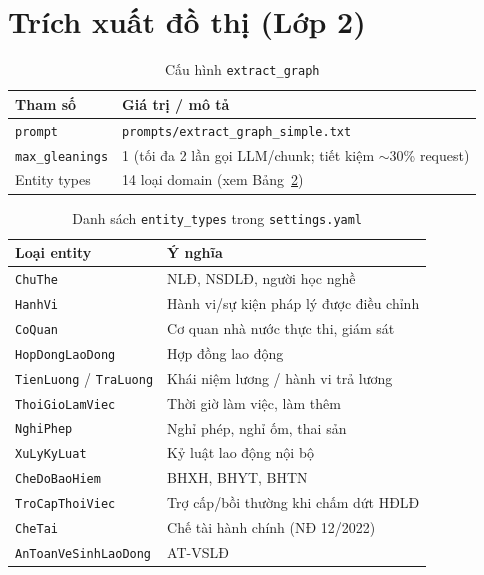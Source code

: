 \documentclass[../DoAn.tex]{subfiles}
\begin{document}
\section{Trích xuất đồ thị (Lớp 2)}
\label{appendix:a-extract}

\begin{table}[htbp]
\centering
\caption{Cấu hình \texttt{extract\_graph}}
\label{table:extract-config}
\small
\begin{tabular}{|l|p{9.5cm}|}
\hline
\textbf{Tham số} & \textbf{Giá trị / mô tả} \\
\hline
\texttt{prompt} & \texttt{prompts/extract\_graph\_simple.txt} \\
\texttt{max\_gleanings} & 1 (tối đa 2 lần gọi LLM/chunk; tiết kiệm $\sim$30\% request) \\
Entity types & 14 loại domain (xem Bảng~\ref{table:entity-types}) \\
\hline
\end{tabular}
\end{table}

\begin{table}[htbp]
\centering
\caption{Danh sách \texttt{entity\_types} trong \texttt{settings.yaml}}
\label{table:entity-types}
\small
\begin{tabular}{|l|p{8.5cm}|}
\hline
\textbf{Loại entity} & \textbf{Ý nghĩa} \\
\hline
\texttt{ChuThe} & NLĐ, NSDLĐ, người học nghề \\
\texttt{HanhVi} & Hành vi/sự kiện pháp lý được điều chỉnh \\
\texttt{CoQuan} & Cơ quan nhà nước thực thi, giám sát \\
\texttt{HopDongLaoDong} & Hợp đồng lao động \\
\texttt{TienLuong} / \texttt{TraLuong} & Khái niệm lương / hành vi trả lương \\
\texttt{ThoiGioLamViec} & Thời giờ làm việc, làm thêm \\
\texttt{NghiPhep} & Nghỉ phép, nghỉ ốm, thai sản \\
\texttt{XuLyKyLuat} & Kỷ luật lao động nội bộ \\
\texttt{CheDoBaoHiem} & BHXH, BHYT, BHTN \\
\texttt{TroCapThoiViec} & Trợ cấp/bồi thường khi chấm dứt HĐLĐ \\
\texttt{CheTai} & Chế tài hành chính (NĐ 12/2022) \\
\texttt{AnToanVeSinhLaoDong} & AT-VSLĐ \\
\hline
\end{tabular}
\end{table}
\end{document}
